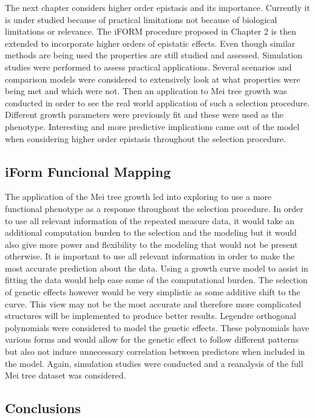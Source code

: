 \documentclass[11pt,]{book}
\theoremstyle{definition}
\theoremstyle{definition}
\theoremstyle{remark}
\begin{document}
The next chapter considers higher order epistasis and its importance.
Currently it is under studied because of practical limitations not
because of biological limitations or relevance. The iFORM procedure
proposed in Chapter 2 is then extended to incorporate higher orders of
epistatic effects. Even though similar methods are being used the
properties are still studied and assessed. Simulation studies were
performed to assess practical applications. Several scenarios and
comparison models were considered to extensively look at what properties
were being met and which were not. Then an application to Mei tree
growth was conducted in order to see the real world application of such
a selection procedure. Different growth parameters were previously fit
and these were used as the phenotype. Interesting and more predictive
implications came out of the model when considering higher order
epistasis throughout the selection procedure.

\subsection{iForm Funcional Mapping}\label{iform-funcional-mapping}

The application of the Mei tree growth led into exploring to use a more
functional phenotype as a response throughout the selection procedure.
In order to use all relevant information of the repeated measure data,
it would take an additional computation burden to the selection and the
modeling but it would also give more power and flexibility to the
modeling that would not be present otherwise. It is important to use all
relevant information in order to make the most accurate prediction about
the data. Using a growth curve model to assist in fitting the data would
help ease some of the computational burden. The selection of genetic
effects however would be very simplistic as some additive shift to the
curve. This view may not be the most accurate and therefore more
complicated structures will be implemented to produce better results.
Legendre orthogonal polynomials were considered to model the genetic
effects. These polynomials have various forms and would allow for the
genetic effect to follow different patterns but also not induce
unnecessary correlation between predictors when included in the model.
Again, simulation studies were conducted and a reanalysis of the full
Mei tree dataset was considered.

\subsection{Conclusions}\label{conclusions}
\end{document}
